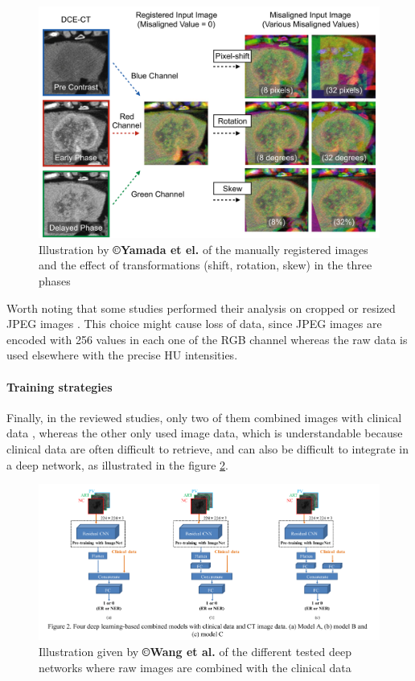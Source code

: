 \documentclass[]{article}
\let\oldparagraph\paragraph
\renewcommand{\paragraph}[1]{\oldparagraph{#1}\mbox{}}
\begin{document}
\begin{figure}[th!]
\centering
\includegraphics[width=0.7\linewidth]{images/image12}
\caption{Illustration by \textbf{©Yamada et el.} of the manually registered images and the effect of transformations (shift, rotation, skew) in the three phases \cite{Yamada2019}}
\label{Yamada2019_Fig1}
\end{figure}


Worth noting that some studies performed their analysis on cropped or
resized JPEG images \cite{Yasaka2018,Yasaka2018a,WANG2019}. This choice might cause loss of data, since JPEG images are encoded with 256 values in each one of the RGB channel whereas the raw data is used elsewhere with the precise HU intensities.

\paragraph{Training strategies}\label{training-strategies}

Finally, in the reviewed studies, only two of them combined images with
clinical data \cite{Yasaka2018a,WANG2019}, whereas the other only used image data, which is
understandable because clinical data are often difficult to retrieve,
and can also be difficult to integrate in a deep network, as illustrated
in the figure \ref{Wang2019_Fig2}.


\begin{figure}[th!]
\centering
\includegraphics[width=0.7\linewidth]{images/image5}
\caption{Illustration given by \textbf{©Wang et al.} of the different tested deep networks where raw images are combined with the clinical data \cite{WANG2019}}
\label{Wang2019_Fig2}
\end{figure}
\end{document}

